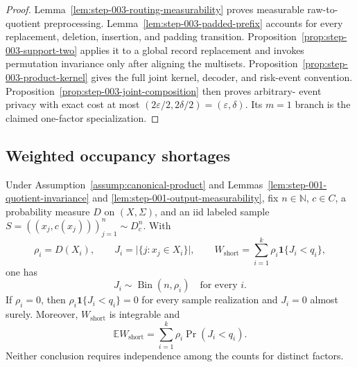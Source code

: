\begin{proof}
Lemma~\ref{lem:step-003-routing-measurability} proves measurable raw-to-
quotient preprocessing.  Lemma~\ref{lem:step-003-padded-prefix} accounts for
every replacement, deletion, insertion, and padding transition.
Proposition~\ref{prop:step-003-support-two} applies it to a global record
replacement and invokes permutation invariance only after aligning the
multisets.  Proposition~\ref{prop:step-003-product-kernel} gives the full
joint kernel, decoder, and risk-event convention.
Proposition~\ref{prop:step-003-joint-composition} then proves arbitrary-
event privacy with exact cost at most
\((2\varepsilon/2,2\delta/2)=(\varepsilon,\delta)\).  Its \(m=1\) branch
is the claimed one-factor specialization.
\end{proof}

\subsection{Weighted occupancy shortages}\label{app:step-004}

\begin{lemma}
\label{lem:step-004-binomial-accounting}
Under Assumption~\ref{assump:canonical-product} and
Lemmas~\ref{lem:step-001-quotient-invariance} and
\ref{lem:step-001-output-measurability}, fix \(n\in\mathbb N\),
\(c\in C\), a probability measure \(D\) on \((X,\Sigma)\), and an iid
labeled sample
\(S=((x_j,c(x_j)))_{j=1}^n\sim D_c^n\).  With
\[
\rho_i=D(X_i),\qquad
J_i=\bigl|\{j:x_j\in X_i\}\bigr|,
\qquad
W_{\mathrm{short}}
=\sum_{i=1}^k\rho_i\mathbf 1\{J_i<q_i\},
\]
one has
\begin{equation}\label{eq:step-004-binomial-law}
J_i\sim\operatorname{Bin}(n,\rho_i)
\quad\text{for every }i.
\end{equation}
If \(\rho_i=0\), then
\(\rho_i\mathbf 1\{J_i<q_i\}=0\) for every sample realization and
\(J_i=0\) almost surely.  Moreover, \(W_{\mathrm{short}}\) is integrable
and
\begin{equation}\label{eq:step-004-expectation-identity}
\mathbb E W_{\mathrm{short}}
=\sum_{i=1}^k\rho_i\Pr(J_i<q_i).
\end{equation}
Neither conclusion requires independence among the counts for distinct
factors.
\end{lemma}

